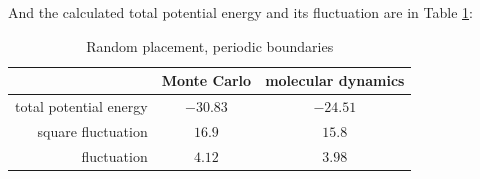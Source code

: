 \documentclass[UTF8,a4paper]{article}
\begin{document}
And the calculated total potential energy and its fluctuation are in Table \ref{tab:rand_p}:
\begin{table}[H]
	\centering
	\caption{Random placement, periodic boundaries}
	\begin{tabular}{rcc}
		\toprule
		\toprule
		                       & Monte Carlo & molecular dynamics \\ \midrule
		total potential energy & $-30.83$    & $-24.51$           \\
		square fluctuation     & $16.9$      & $15.8$             \\
		fluctuation            & $4.12$      & $3.98$             \\
		\bottomrule
	\end{tabular}%
	\label{tab:rand_p}%
\end{table}%
\end{document}
